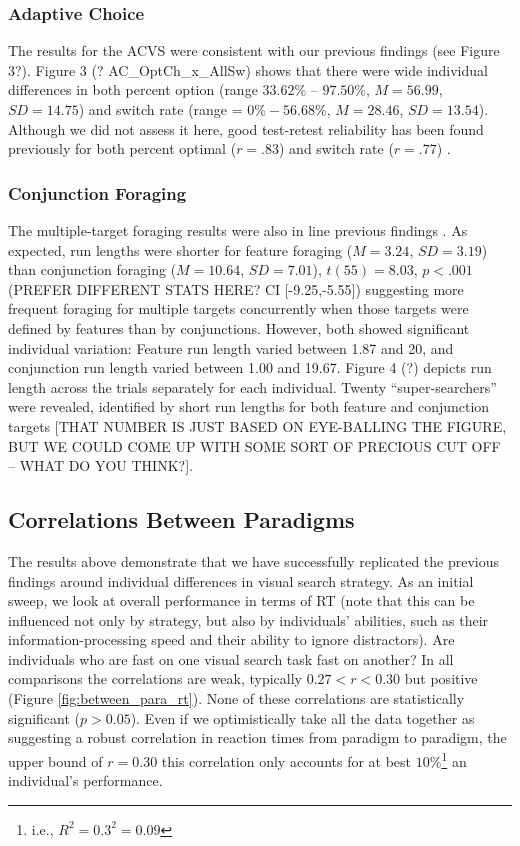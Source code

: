 \documentclass[]{rsos}%
\begin{document}
\subsubsection{Adaptive Choice}

The results for the ACVS were consistent with our previous findings \cite{irons-leber2016,irons-leber2018} (see Figure 3?). Figure 3 (? AC_OptCh_x_AllSw) shows that there were wide individual differences in both percent option (range $33.62\%$ – $97.50\%$, $M = 56.99$, $SD = 14.75$) and switch rate (range = $0\% - 56.68\%$, $M = 28.46$, $SD = 13.54$). Although we did not assess it here, good test-retest reliability has been found previously for both percent optimal ($r = .83$) and switch rate ($r = .77$) \cite{irons-leber,2018}.

\subsubsection{Conjunction Foraging}

The multiple-target foraging results were also in line previous findings \cite{kristjansson2014,johannesson2016}. As expected, run lengths were shorter for feature foraging ($M = 3.24$, $SD = 3.19$) than conjunction foraging ($M = 10.64$, $SD = 7.01$), $t(55) = 8.03$, $p < .001$ (PREFER DIFFERENT STATS HERE? CI [-9.25,-5.55]) suggesting more frequent foraging for multiple targets concurrently when those targets were defined by features than by conjunctions. However, both showed significant individual variation: Feature run length varied between 1.87 and 20, and conjunction run length varied between 1.00 and 19.67. Figure 4 (?) depicts run length across the trials separately for each individual. Twenty “super-searchers” were revealed, identified by short run lengths for both feature and conjunction targets [THAT NUMBER IS JUST BASED ON EYE-BALLING THE FIGURE, BUT WE COULD COME UP WITH SOME SORT OF PRECIOUS CUT OFF – WHAT DO YOU THINK?]. 


\subsection{Correlations Between Paradigms}

The results above demonstrate that we have successfully replicated the previous findings around individual differences in visual search strategy. As an initial sweep, we look at overall performance in terms of RT (note that this can be influenced not only by strategy, but also by individuals’ abilities, such as their information-processing speed and their ability to ignore distractors). Are individuals who are fast on one visual search task fast on another? In all comparisons the correlations are weak, typically $0.27 < r <0.30$ but positive (Figure \ref{fig:between_para_rt}). None of these correlations are statistically significant ($p>0.05$). Even if we optimistically take all the data together as suggesting a robust correlation in reaction times from paradigm to paradigm, the upper bound of $r=0.30$ this correlation only accounts for at best $10\%$\footnote{i.e., $R^2 = 0.3^2 = 0.09$} an individual's performance. 
\end{document}

